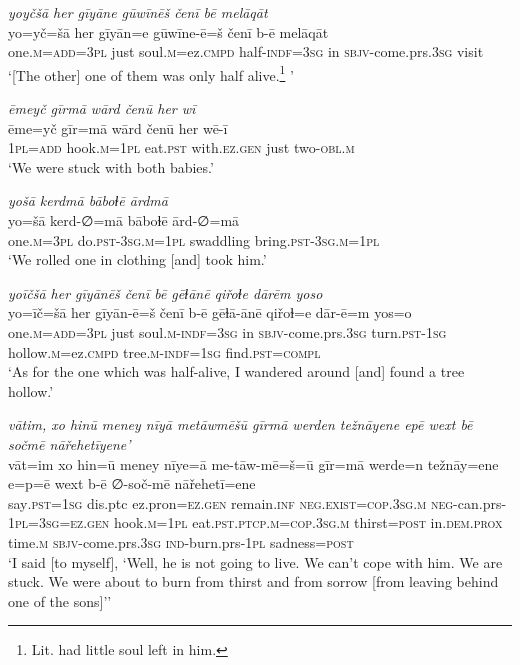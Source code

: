 \ea \label{ZQ.19}
\textit{yoyčšā her gīyāne gūwīnēš čenī bē melāqāt} \\ 
\gll yo=yč=šā her gīyān=e gūwīne-ē=š čenī b-ē melāqāt \\ 
 one\textsc{.m}\textsc{=add}\textsc{=3pl} just soul\textsc{.m}=ez\textsc{.cmpd} half\textsc{-indf}\textsc{=3sg} in \textsc{sbjv-}come.prs\textsc{.3sg} visit \\ 
\glt `[The other] one of them was only half alive.\footnote{Lit. had little soul left in him.}    '
\z 
 
\ea \label{ZQ.21}
\textit{ēmeyč gīrmā wārd čenū her wī} \\ 
\gll ēme=yč gīr=mā wārd čenū her wē-ī \\ 
 \textsc{1pl}\textsc{=add} hook\textsc{.m}\textsc{=\textsc{1pl}} eat\textsc{.pst} with\textsc{.ez.gen} just two\textsc{-obl}\textsc{.m} \\ 
\glt `We were stuck with both babies.'
\z 
 
\ea \label{ZQ.22}
\textit{yošā kerdmā bāboɫē ārdmā} \\ 
\gll yo=šā kerd-∅=mā bāboɫē ārd-∅=mā \\ 
 one\textsc{.m}\textsc{=3pl} do\textsc{.pst}\textsc{-3sg}\textsc{.m}\textsc{=\textsc{1pl}} swaddling bring\textsc{.pst}\textsc{-3sg}\textsc{.m}\textsc{=\textsc{1pl}} \\ 
\glt `We rolled one in clothing [and] took him.'
\z 
 
\ea \label{ZQ.23}
\textit{yoīčšā her gīyānēš čenī bē gēɫānē qiřoɫe dārēm yoso} \\ 
\gll yo=īč=šā her gīyān-ē=š čenī b-ē gēɫā-ānē qiřoɫ=e dār-ē=m yos=o \\ 
 one\textsc{.m}\textsc{=add}\textsc{=3pl} just soul\textsc{.m}\textsc{-indf}\textsc{=3sg} in \textsc{sbjv-}come.prs\textsc{.3sg} turn\textsc{.pst}\textsc{-\textsc{1sg}} hollow\textsc{.m}=ez\textsc{.cmpd} tree\textsc{.m}\textsc{-indf}\textsc{=\textsc{1sg}} find\textsc{.pst}\textsc{=compl} \\ 
\glt `As for the one which was half-alive, I wandered around [and] found a tree hollow.'
\z 
 
\ea \label{ZQ.25}
\textit{vātim, xo hinū meney nīyā metāwmēšū gīrmā werden težnāyene epē wext bē sočmē nāřehetīyene’} \\ 
\gll vāt=im xo hin=ū meney nīye=ā me-tāw-mē=š=ū gīr=mā werde=n težnāy=ene e=p=ē wext b-ē ∅-soč-mē nāřehetī=ene \\ 
 say\textsc{.pst}\textsc{=\textsc{1sg}} dis.ptc ez.pron\textsc{=ez.gen} remain\textsc{.inf} \textsc{\textsc{neg.}exist}\textsc{=cop}\textsc{.3sg}\textsc{.m} \textsc{neg-}can.prs\textsc{-\textsc{1pl}}\textsc{=3sg}\textsc{=ez.gen} hook\textsc{.m}\textsc{=\textsc{1pl}} eat\textsc{.pst}\textsc{.ptcp}\textsc{.m}\textsc{=cop}\textsc{.3sg}\textsc{.m} thirst\textsc{=\textsc{post}} in.\textsc{dem.prox} time\textsc{.m} \textsc{sbjv-}come.prs\textsc{.3sg} \textsc{ind-}burn.prs\textsc{-\textsc{1pl}} sadness\textsc{=\textsc{post}} \\ 
\glt `I said [to myself], ‘Well, he is not going to live. We can’t cope with him. We are stuck. We were about to burn from thirst and from sorrow [from leaving behind one of the sons]’'
\z 
 
